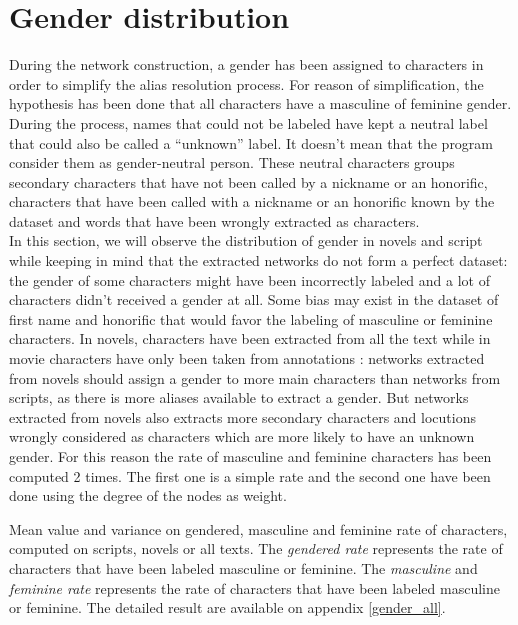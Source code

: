 \documentclass[a4paper, 12pt]{report}
\begin{document}
\section{Gender distribution}
During the network construction, a gender has been assigned to characters in order to simplify the alias resolution process. 
For reason of simplification, the hypothesis has been done that all characters have a masculine of feminine gender. 
During the process, names that could not be labeled have kept a neutral label that could also be called a ``unknown'' label. 
It doesn't mean that the program consider them as gender-neutral person. 
These neutral characters groups secondary characters that have not been called 
by a nickname or an honorific, characters that have been called with a nickname or an honorific  known by the dataset and words that have been wrongly extracted as characters.\\

In this section, we will observe the distribution of gender in novels and script while keeping in mind that the extracted networks do not form a perfect dataset: 
the gender of some characters might have been incorrectly labeled and a lot of characters didn't received a gender at all.
 Some bias may exist in the dataset of first name and honorific that would favor the labeling of masculine or feminine characters. 
 In novels, characters have been extracted from all the text while in movie characters have only been taken from annotations : 
 networks extracted from novels should assign a gender to more main characters than networks from scripts, as there is more aliases available to extract a gender. 
 But networks extracted from novels also extracts more secondary characters and locutions wrongly considered as characters which are more likely to have an unknown gender. 
 For this reason the rate of masculine and feminine characters has been computed 2 times. 
 The first one is a simple rate and the second one have been done using the degree of the nodes as weight.\\

\begin{table}[]
\caption{Mean value and variance on gendered, masculine and feminine rate of characters, computed on scripts, novels or all texts. The \textit{gendered rate} represents the  rate of characters that have been labeled masculine or feminine. The \textit{masculine} and \textit{feminine rate} represents the rate of characters that have been labeled masculine or feminine. The detailed result are available on appendix \ref{gender_all}.}
 \label{gender_short}
\end{table}
\end{document}
